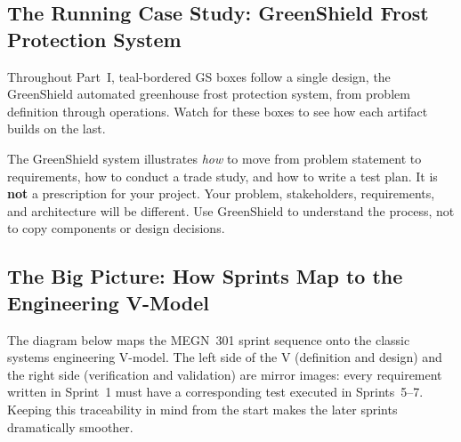 \subsection*{The Running Case Study: GreenShield Frost Protection System}
Throughout Part~I, teal-bordered \textsf{GS} boxes follow a single design, the GreenShield automated greenhouse frost protection system, from problem definition through operations. Watch for these boxes to see how each artifact builds on the last.


\begin{warningbox}
The GreenShield system illustrates \emph{how} to move from problem statement to requirements, how to conduct a trade study, and how to write a test plan. It is \textbf{not} a prescription for your project. Your problem, stakeholders, requirements, and architecture will be different. Use GreenShield to understand the process, not to copy components or design decisions.
\end{warningbox}


\subsection*{The Big Picture: How Sprints Map to the Engineering V-Model}

The diagram below maps the MEGN~301 sprint sequence onto the classic systems engineering V-model. The left side of the V (definition and design) and the right side (verification and validation) are mirror images: every requirement written in Sprint~1 must have a corresponding test executed in Sprints~5--7. Keeping this traceability in mind from the start makes the later sprints dramatically smoother.

